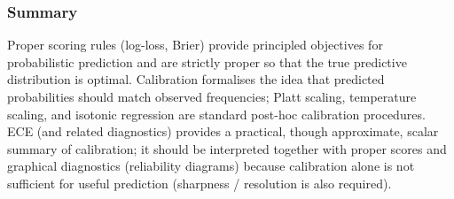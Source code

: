 \subsubsection{Summary}
Proper scoring rules (log-loss, Brier) provide principled objectives for probabilistic prediction and are strictly proper so that the true predictive distribution is optimal. Calibration formalises the idea that predicted probabilities should match observed frequencies; Platt scaling, temperature scaling, and isotonic regression are standard post-hoc calibration procedures. ECE (and related diagnostics) provides a practical, though approximate, scalar summary of calibration; it should be interpreted together with proper scores and graphical diagnostics (reliability diagrams) because calibration alone is not sufficient for useful prediction (sharpness / resolution is also required).
